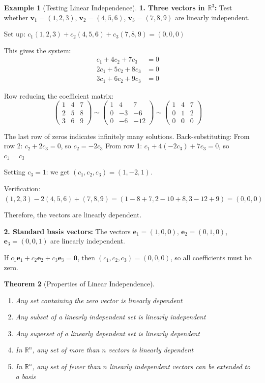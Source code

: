 \documentclass[12pt]{article}
\numberwithin{equation}{section}
\newcommand{\vect}[1]{\boldsymbol{#1}}   %
\theoremstyle{plain}
\newtheorem{theorem}{Theorem}[section]
\theoremstyle{definition}
\newtheorem{example}[theorem]{Example}
\theoremstyle{remark}
\begin{document}
\begin{example}[Testing Linear Independence]
\textbf{1. Three vectors in $\mathbb{R}^3$:}
Test whether $\vect{v}_1 = (1, 2, 3)$, $\vect{v}_2 = (4, 5, 6)$, $\vect{v}_3 = (7, 8, 9)$ are linearly independent.

Set up: $c_1(1, 2, 3) + c_2(4, 5, 6) + c_3(7, 8, 9) = (0, 0, 0)$

This gives the system:
\begin{align}
c_1 + 4c_2 + 7c_3 &= 0\\
2c_1 + 5c_2 + 8c_3 &= 0\\
3c_1 + 6c_2 + 9c_3 &= 0
\end{align}

Row reducing the coefficient matrix:
$$\begin{pmatrix} 1 & 4 & 7 \\ 2 & 5 & 8 \\ 3 & 6 & 9 \end{pmatrix} \sim \begin{pmatrix} 1 & 4 & 7 \\ 0 & -3 & -6 \\ 0 & -6 & -12 \end{pmatrix} \sim \begin{pmatrix} 1 & 4 & 7 \\ 0 & 1 & 2 \\ 0 & 0 & 0 \end{pmatrix}$$

The last row of zeros indicates infinitely many solutions. Back-substituting:
From row 2: $c_2 + 2c_3 = 0$, so $c_2 = -2c_3$
From row 1: $c_1 + 4(-2c_3) + 7c_3 = 0$, so $c_1 = c_3$

Setting $c_3 = 1$: we get $(c_1, c_2, c_3) = (1, -2, 1)$.

Verification: $(1, 2, 3) - 2(4, 5, 6) + (7, 8, 9) = (1-8+7, 2-10+8, 3-12+9) = (0, 0, 0)$ \checkmark

Therefore, the vectors are linearly dependent.

\textbf{2. Standard basis vectors:}
The vectors $\vect{e}_1 = (1, 0, 0)$, $\vect{e}_2 = (0, 1, 0)$, $\vect{e}_3 = (0, 0, 1)$ are linearly independent.

If $c_1\vect{e}_1 + c_2\vect{e}_2 + c_3\vect{e}_3 = \vect{0}$, then $(c_1, c_2, c_3) = (0, 0, 0)$, so all coefficients must be zero.
\end{example}

\begin{theorem}[Properties of Linear Independence]
\begin{enumerate}
\item Any set containing the zero vector is linearly dependent
\item Any subset of a linearly independent set is linearly independent
\item Any superset of a linearly dependent set is linearly dependent
\item In $\mathbb{R}^n$, any set of more than $n$ vectors is linearly dependent
\item In $\mathbb{R}^n$, any set of fewer than $n$ linearly independent vectors can be extended to a basis
\end{enumerate}
\end{theorem}
\end{document}
